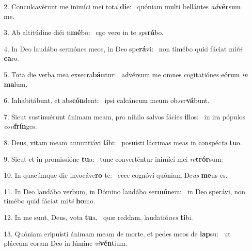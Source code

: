 2. Conculcavérunt me inimíci mei tota \textbf{di}e: \ast\  quóniam multi bellántes \textit{ad}\textbf{vér}sum me.\

3. Ab altitúdine diéi ti\textbf{mé}bo: \ast\  ego vero in te \textit{spe}\textbf{rá}bo.\

4. In Deo laudábo sermónes meos, in Deo spe\textbf{rá}vi: \ast\  non timébo quid fáciat mi\textit{hi} \textbf{ca}ro.\

5. Tota die verba mea exsecra\textbf{bán}tur: \ast\  advérsum me omnes cogitatiónes eórum \textit{in} \textbf{ma}lum.\

6. Inhabitábunt, et abs\textbf{cón}dent: \ast\  ipsi calcáneum meum ob\textit{ser}\textbf{vá}bunt.\

7. Sicut sustinuérunt ánimam meam, pro níhilo salvos fácies \textbf{il}los: \ast\  in ira pópulos \textit{con}\textbf{frín}ges.\

8. Deus, vitam meam annuntiávi \textbf{ti}bi: \ast\  posuísti lácrimas meas in conspéc\textit{tu} \textbf{tu}o.\

9. Sicut et in promissióne \textbf{tu}a: \ast\  tunc converténtur inimíci mei \textit{re}\textbf{trór}sum:\

10. In quacúmque die invocáve\textbf{ro} te: \ast\  ecce cognóvi quóniam De\textit{us} \textbf{me}us es.\

11. In Deo laudábo verbum, in Dómino laudábo ser\textbf{mó}nem: \ast\  in Deo sperávi, non timébo quid fáciat mi\textit{hi} \textbf{ho}mo.\

12. In me sunt, Deus, vota \textbf{tu}a, \ast\  quæ reddam, laudatió\textit{nes} \textbf{ti}bi.\

13. Quóniam eripuísti ánimam meam de morte, et pedes meos de \textbf{lap}su: \ast\  ut pláceam coram Deo in lúmine \textit{vi}\textbf{vén}tium.\


